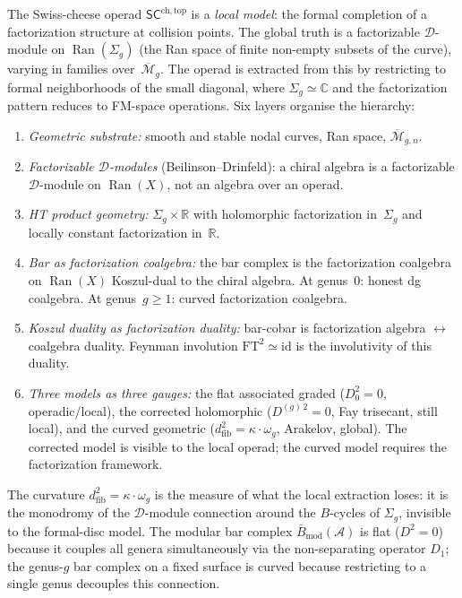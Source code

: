 \documentclass[11pt]{report}
\theoremstyle{definition}
\theoremstyle{remark}
\providecommand{\cA}{\mathcal{A}}
\providecommand{\cM}{\mathcal{M}}
\providecommand{\barB}{\bar{B}}
\numberwithin{equation}{section}
\begin{document}
The Swiss-cheese operad $\mathsf{SC}^{\mathrm{ch,top}}$ is a
\emph{local model}: the formal completion of a factorization
structure at collision points. The global truth is a factorizable
$\mathcal D$-module on $\operatorname{Ran}(\Sigma_g)$ (the Ran
space of finite non-empty subsets of the curve), varying in families
over~$\overline{\cM}_g$. The operad is extracted from this by
restricting to formal neighborhoods of the small diagonal, where
$\Sigma_g \simeq \mathbb C$ and the factorization pattern reduces
to FM-space operations. Six layers organise the hierarchy:
\begin{enumerate}[label=(\roman*),nosep]
\item \emph{Geometric substrate:} smooth and stable nodal curves,
 Ran space, $\overline{\cM}_{g,n}$.
\item \emph{Factorizable $\mathcal D$-modules} (Beilinson--Drinfeld):
 a chiral algebra is a factorizable $\mathcal D$-module on
 $\operatorname{Ran}(X)$, not an algebra over an operad.
\item \emph{HT product geometry:} $\Sigma_g \times \mathbb R$ with
 holomorphic factorization in~$\Sigma_g$ and locally constant
 factorization in~$\mathbb R$.
\item \emph{Bar as factorization coalgebra:} the bar complex is the
 factorization coalgebra on $\operatorname{Ran}(X)$ Koszul-dual to
 the chiral algebra. At genus~$0$: honest dg coalgebra. At
 genus~$g \ge 1$: curved factorization coalgebra.
\item \emph{Koszul duality as factorization duality:} bar-cobar is
 factorization algebra $\leftrightarrow$ coalgebra duality.
 Feynman involution $\mathrm{FT}^2 \simeq \mathrm{id}$ is the
 involutivity of this duality.
\item \emph{Three models as three gauges:} the flat associated graded
 ($D_0^2 = 0$, operadic/local), the corrected holomorphic
 ($D^{(g)\,2} = 0$, Fay trisecant, still local), and the curved
 geometric ($d_{\mathrm{fib}}^2 = \kappa \cdot \omega_g$, Arakelov,
 global). The corrected model is visible to the local operad; the
 curved model requires the factorization framework.
\end{enumerate}
The curvature $d_{\mathrm{fib}}^2 = \kappa \cdot \omega_g$ is the
measure of what the local extraction loses: it is the monodromy of
the $\mathcal D$-module connection around the $B$-cycles of
$\Sigma_g$, invisible to the formal-disc model. The modular bar
complex $\barB_{\mathrm{mod}}(\cA)$ is flat ($D^2 = 0$) because it
couples all genera simultaneously via the non-separating operator
$D_1$; the genus-$g$ bar complex on a fixed surface is curved
because restricting to a single genus decouples this connection.
\end{document}
